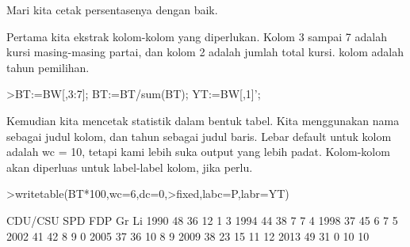\documentclass[a4paper,10pt]{article}
\begin{document}
\begin{eulernotebook}
\begin{eulercomment}
\begin{eulercomment}
\begin{eulercomment}
\begin{eulercomment}
\begin{eulercomment}
\begin{eulercomment}
\begin{eulercomment}
\begin{eulercomment}
\begin{eulercomment}
\begin{eulercomment}
\begin{eulercomment}
\begin{eulercomment}
\begin{eulercomment}
\begin{eulercomment}
\begin{eulercomment}
\begin{eulercomment}
\begin{eulercomment}
\begin{eulercomment}
\begin{eulercomment}
\begin{eulercomment}
\begin{eulercomment}
\begin{eulercomment}
\begin{eulercomment}
\begin{eulercomment}
\begin{eulercomment}
\begin{eulercomment}
\begin{eulercomment}
\begin{eulercomment}
\begin{eulercomment}
\begin{eulercomment}
\begin{eulercomment}
\begin{eulercomment}
\begin{eulercomment}
\begin{eulercomment}
\begin{eulercomment}
\begin{eulercomment}
\begin{eulercomment}
\begin{eulercomment}
\begin{eulercomment}
\begin{eulercomment}
\begin{eulercomment}
\begin{eulercomment}
\begin{eulercomment}
\begin{eulercomment}
\begin{eulerprompt}
\end{eulerprompt}
\begin{eulercomment}
Mari kita cetak persentasenya dengan baik.

Pertama kita ekstrak kolom-kolom yang diperlukan. Kolom 3 sampai 7
adalah kursi masing-masing partai, dan kolom 2 adalah jumlah total
kursi. kolom adalah tahun pemilihan.
\end{eulercomment}
\begin{eulerprompt}
>BT:=BW[,3:7]; BT:=BT/sum(BT); YT:=BW[,1]';
\end{eulerprompt}
\begin{eulercomment}
Kemudian kita mencetak statistik dalam bentuk tabel. Kita menggunakan
nama sebagai judul kolom, dan tahun sebagai judul baris. Lebar default
untuk kolom adalah wc = 10, tetapi kami lebih suka output yang lebih
padat. Kolom-kolom akan diperluas untuk label-label kolom, jika perlu.
\end{eulercomment}
\begin{eulerprompt}
>writetable(BT*100,wc=6,dc=0,>fixed,labc=P,labr=YT)
\end{eulerprompt}
\begin{euleroutput}
         CDU/CSU   SPD   FDP    Gr    Li
    1990      48    36    12     1     3
    1994      44    38     7     7     4
    1998      37    45     6     7     5
    2002      41    42     8     9     0
    2005      37    36    10     8     9
    2009      38    23    15    11    12
    2013      49    31     0    10    10

\end{euleroutput}
\end{eulercomment}
\end{eulercomment}
\end{eulercomment}
\end{eulercomment}
\end{eulercomment}
\end{eulercomment}
\end{eulercomment}
\end{eulercomment}
\end{eulercomment}
\end{eulercomment}
\end{eulercomment}
\end{eulercomment}
\end{eulercomment}
\end{eulercomment}
\end{eulercomment}
\end{eulercomment}
\end{eulercomment}
\end{eulercomment}
\end{eulercomment}
\end{eulercomment}
\end{eulercomment}
\end{eulercomment}
\end{eulercomment}
\end{eulercomment}
\end{eulercomment}
\end{eulercomment}
\end{eulercomment}
\end{eulercomment}
\end{eulercomment}
\end{eulercomment}
\end{eulercomment}
\end{eulercomment}
\end{eulercomment}
\end{eulercomment}
\end{eulercomment}
\end{eulercomment}
\end{eulercomment}
\end{eulercomment}
\end{eulercomment}
\end{eulercomment}
\end{eulercomment}
\end{eulercomment}
\end{eulercomment}
\end{eulercomment}
\end{eulernotebook}
\end{document}
